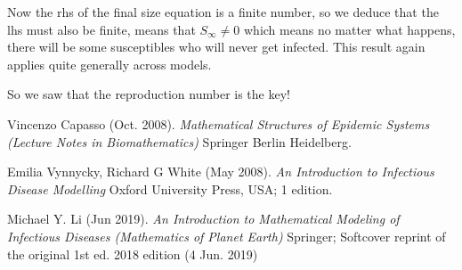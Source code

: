 \documentclass[fontsize=17pt]{article}
\begin{document}
Now the rhs of the final size equation is a finite number, so we deduce that the lhs must also be finite, means that $S_{\infty}\neq0$ which means no matter what happens, there will be some susceptibles who will never get infected. This result again applies quite generally across models.

So we saw that the reproduction number is the key!

 

\begin{thebibliography}{1}
	
	Vincenzo Capasso (Oct. 2008).
	\newblock \textit{Mathematical Structures of Epidemic Systems (Lecture Notes in Biomathematics)}
	\newblock Springer Berlin Heidelberg.
	
	Emilia Vynnycky, Richard G White (May 2008).
	\newblock \textit{An Introduction to Infectious Disease Modelling}
	\newblock  Oxford University Press, USA; 1 edition.
	
	Michael Y. Li (Jun 2019).
	\newblock \textit{An Introduction to Mathematical Modeling of Infectious Diseases (Mathematics of Planet Earth)}
	\newblock  Springer; Softcover reprint of the original 1st ed. 2018 edition (4 Jun. 2019)
	
\end{thebibliography}
\appendix
\end{document}
